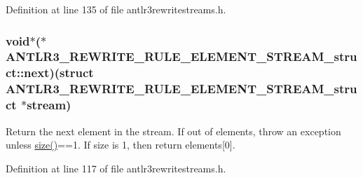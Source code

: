 Definition at line 135 of file antlr3rewritestreams.\-h.

\hypertarget{struct_a_n_t_l_r3___r_e_w_r_i_t_e___r_u_l_e___e_l_e_m_e_n_t___s_t_r_e_a_m__struct_a49a3d89cea69ba728843b12a5cfd51e3}{
\subsubsection[{next}]{\setlength{\rightskip}{0pt plus 5cm}void$\ast$($\ast$ A\-N\-T\-L\-R3\-\_\-\-R\-E\-W\-R\-I\-T\-E\-\_\-\-R\-U\-L\-E\-\_\-\-E\-L\-E\-M\-E\-N\-T\-\_\-\-S\-T\-R\-E\-A\-M\-\_\-struct\-::next)(struct {\bf A\-N\-T\-L\-R3\-\_\-\-R\-E\-W\-R\-I\-T\-E\-\_\-\-R\-U\-L\-E\-\_\-\-E\-L\-E\-M\-E\-N\-T\-\_\-\-S\-T\-R\-E\-A\-M\-\_\-struct} $\ast$stream)}}\label{struct_a_n_t_l_r3___r_e_w_r_i_t_e___r_u_l_e___e_l_e_m_e_n_t___s_t_r_e_a_m__struct_a49a3d89cea69ba728843b12a5cfd51e3}
Return the next element in the stream. If out of elements, throw an exception unless \hyperlink{struct_a_n_t_l_r3___r_e_w_r_i_t_e___r_u_l_e___e_l_e_m_e_n_t___s_t_r_e_a_m__struct_ac1c8e6814f647b356c1e1b77e3e589fd}{size()}==1. If size is 1, then return elements\mbox{[}0\mbox{]}. 

Definition at line 117 of file antlr3rewritestreams.\-h.

